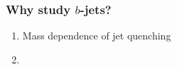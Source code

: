 \begin{frame}

  \frametitle{Why study $b$-jets?}

  \centering

  \begin{enumerate}
  \item Mass dependence of jet quenching
  \item 
  \end{enumerate}
  

\end{frame}
